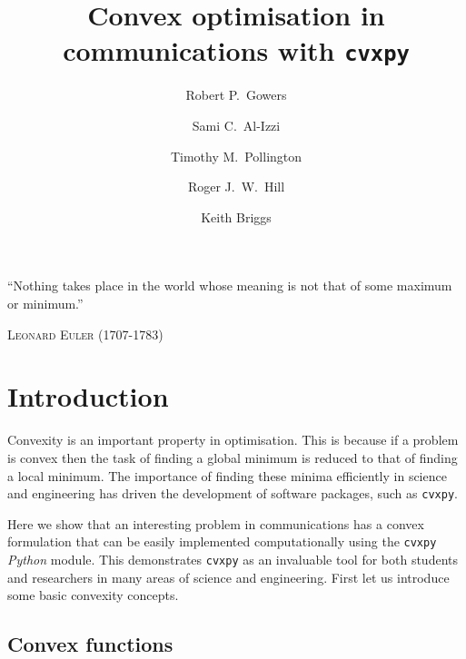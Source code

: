 \documentclass[twocolumn,secnumarabic,amssymb, nobibnotes, aps, prl,superscriptaddress]{revtex4-1}
\newcommand{\NewsItem}[1]{%
		\large #1 \vspace{4pt}
		\par \normalsize \normalfont}
\newcommand{\NewsAuthor}[1]{%
			\hfill \textsc{#1} \vspace{4pt}
			\par \normalfont}
\begin{document}

\title{Convex optimisation in communications with \texttt{cvxpy}}
\author{Robert P.~Gowers}%
\author{Sami C.~Al-Izzi}%
\author{Timothy M.~Pollington}%
\author{Roger J.~W.~Hill}%
\author{Keith Briggs}
\maketitle


	\NewsItem{``Nothing takes place in the world whose meaning is not that of some maximum or minimum.''}
	\NewsAuthor{Leonard Euler (1707-1783)}
    
\section{Introduction}
Convexity is an important property in optimisation. This is because if a problem is convex then the task of finding a global minimum is reduced to that of finding a local minimum. The importance of finding these minima efficiently in science and engineering has driven the development of software packages, such as \texttt{cvxpy}.

Here we show that an interesting problem in communications has a convex formulation that can be easily implemented computationally using the \texttt{cvxpy} \textit{Python} module. This demonstrates \texttt{cvxpy} as an invaluable tool for both students and researchers in many areas of science and engineering. First let us introduce some basic convexity concepts.

\subsection{Convex functions}
\end{document}
